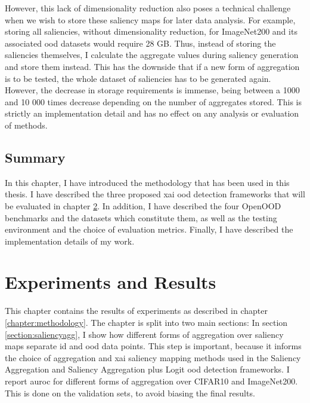 \documentclass[UKenglish]{uiomasterthesis} %
\theoremstyle{definition}
\begin{document}
However, this lack of dimensionality reduction also poses a technical challenge when we wish to store these saliency maps for later data analysis. For example, storing all saliencies, without dimensionality reduction, for ImageNet200 and its associated \ac{ood} datasets would require 28 GB. Thus, instead of storing the saliencies themselves, I calculate the aggregate values during saliency generation and store them instead. This has the downside that if a new form of aggregation is to be tested, the whole dataset of saliencies has to be generated again. However, the decrease in storage requirements is immense, being between a 1000 and 10 000 times decrease depending on the number of aggregates stored. This is strictly an implementation detail and has no effect on any analysis or evaluation of methods.

\section{Summary}

In this chapter, I have introduced the methodology that has been used in this thesis. I have described the three proposed \ac{xai} \ac{ood} detection frameworks that will be evaluated in chapter \ref{chapter:experiments}. In addition, I have described the four OpenOOD benchmarks and the datasets which constitute them, as well as the testing environment and the choice of evaluation metrics. Finally, I have described the implementation details of my work.

\chapter{Experiments and Results} \label{chapter:experiments}

This chapter contains the results of experiments as described in chapter \ref{chapter:methodology}. The chapter is split into two main sections: In section \ref{section:saliencyagg}, I show how different forms of aggregation over saliency maps separate \ac{id} and \ac{ood} data points. This step is important, because it informs the choice of aggregation and \ac{xai} saliency mapping methods used in the Saliency Aggregation and Saliency Aggregation plus Logit \ac{ood} detection frameworks. I report \ac{auroc} for different forms of aggregation over CIFAR10 and ImageNet200. This is done on the validation sets, to avoid biasing the final results.
\end{document}
